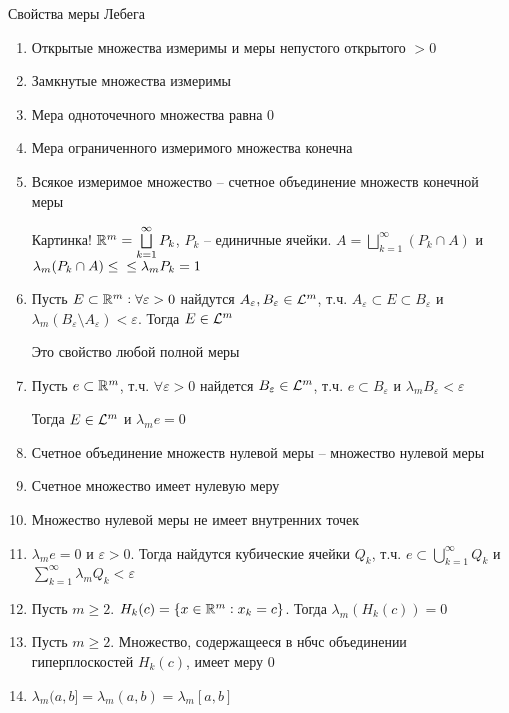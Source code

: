 \documentclass[12pt]{article}
\begin{document}
\begin{theo}{Свойства меры Лебега}
    \begin{enumerate}
        \item Открытые множества измеримы и меры непустого открытого $> 0$
        \item Замкнутые множества измеримы 
        \item Мера одноточечного множества равна 0
        \item Мера ограниченного измеримого множества конечна
        \item Всякое измеримое множество -- счетное объединение множеств конечной меры
        
        Картинка! $\mathbb R^m = \bigsqcup\limits_{k = 1}^\infty P_k$, $P_k$ -- единичные ячейки. $A = \bigsqcup\limits_{k = 1}^\infty (P_k \cap A)$ и $\lambda_m (P_k \cap A) \leq \\ \leq \lambda_m P_k = 1$

        \item Пусть $E \subset \mathbb R^m : \forall \varepsilon > 0$ найдутся $A_\varepsilon, B_\varepsilon \in \mathcal{L}^m$, т.ч. $A_\varepsilon \subset E \subset B_\varepsilon$ и $\lambda_m (B_\varepsilon \setminus A_\varepsilon) < \varepsilon$. Тогда $E \in \mathcal{L}^m$
        
        \begin{Remark}{}
            Это свойство любой полной меры
        \end{Remark}

        \item Пусть $e \subset \mathbb R^m$, т.ч. $\forall \varepsilon > 0$ найдется $B_\varepsilon \in \mathcal{L}^m$, т.ч. $e \subset B_\varepsilon$ и $\lambda_m B_\varepsilon < \varepsilon$
        
        Тогда $E \in \mathcal{L}^m$ и $\lambda_m e = 0$

        \item Счетное объединение множеств нулевой меры -- множество нулевой меры 
        \item Счетное множество имеет нулевую меру 
        \item Множество нулевой меры не имеет внутренних точек 
        \item $\lambda_m e = 0$ и $\varepsilon > 0$. Тогда найдутся кубические ячейки $Q_k$, т.ч. $e \subset \bigcup\limits_{k = 1}^\infty Q_k$ и $\sum\limits_{k = 1}^\infty \lambda_m Q_k < \varepsilon$
        \item Пусть $m \geq 2$. $H_k(c) = \{x \in \mathbb R^m : x_k = c\}$. Тогда $\lambda_m(H_k(c)) = 0$
        \item Пусть $m \geq 2$. Множество, содержащееся в нбчс объединении гиперплоскостей $H_k(c)$, имеет меру 0
        \item $\lambda_m (a, b] = \lambda_m (a, b) = \lambda_m [a, b]$
    \end{enumerate}
\end{theo}
\end{document}
